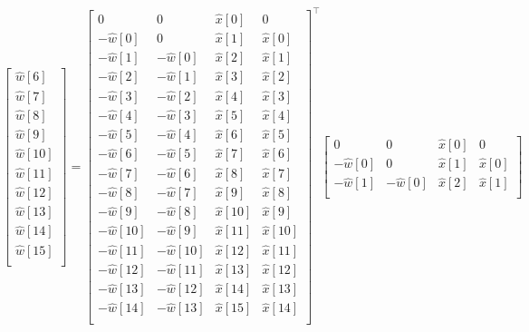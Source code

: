 \documentclass[10pt]{amsart}
\begin{document}
{\[\begin{bmatrix}
 \hat{ w}[ 6]  \\
 \hat{ w}[ 7]  \\
 \hat{ w}[ 8]  \\
 \hat{ w}[ 9]  \\
 \hat{ w}[10]  \\
 \hat{ w}[11]  \\
 \hat{ w}[12]  \\
 \hat{ w}[13]  \\
 \hat{ w}[14]  \\
 \hat{ w}[15]  \\
\end{bmatrix}
 = 
\begin{bmatrix}
         0    &      0      & \hat{x}[ 0] &      0      \\
 -\hat{w}[ 0] &      0      & \hat{x}[ 1] & \hat{x}[ 0] \\
 -\hat{w}[ 1] &-\hat{w}[ 0] & \hat{x}[ 2] & \hat{x}[ 1] \\
 -\hat{w}[ 2] &-\hat{w}[ 1] & \hat{x}[ 3] & \hat{x}[ 2] \\
 -\hat{w}[ 3] &-\hat{w}[ 2] & \hat{x}[ 4] & \hat{x}[ 3] \\
 -\hat{w}[ 4] &-\hat{w}[ 3] & \hat{x}[ 5] & \hat{x}[ 4] \\
 -\hat{w}[ 5] &-\hat{w}[ 4] & \hat{x}[ 6] & \hat{x}[ 5] \\
 -\hat{w}[ 6] &-\hat{w}[ 5] & \hat{x}[ 7] & \hat{x}[ 6] \\
 -\hat{w}[ 7] &-\hat{w}[ 6] & \hat{x}[ 8] & \hat{x}[ 7] \\
 -\hat{w}[ 8] &-\hat{w}[ 7] & \hat{x}[ 9] & \hat{x}[ 8] \\
 -\hat{w}[ 9] &-\hat{w}[ 8] & \hat{x}[10] & \hat{x}[ 9] \\
 -\hat{w}[10] &-\hat{w}[ 9] & \hat{x}[11] & \hat{x}[10] \\
 -\hat{w}[11] &-\hat{w}[10] & \hat{x}[12] & \hat{x}[11] \\
 -\hat{w}[12] &-\hat{w}[11] & \hat{x}[13] & \hat{x}[12] \\
 -\hat{w}[13] &-\hat{w}[12] & \hat{x}[14] & \hat{x}[13] \\
 -\hat{w}[14] &-\hat{w}[13] & \hat{x}[15] & \hat{x}[14] \\
\end{bmatrix}^\top
\begin{bmatrix}
         0    &       0      & \hat{x}[ 0] &      0      \\
 -\hat{w}[ 0] &       0      & \hat{x}[ 1] & \hat{x}[ 0] \\
 -\hat{w}[ 1] & -\hat{w}[ 0] & \hat{x}[ 2] & \hat{x}[ 1] \\

\end{bmatrix}\]}
\end{document}
